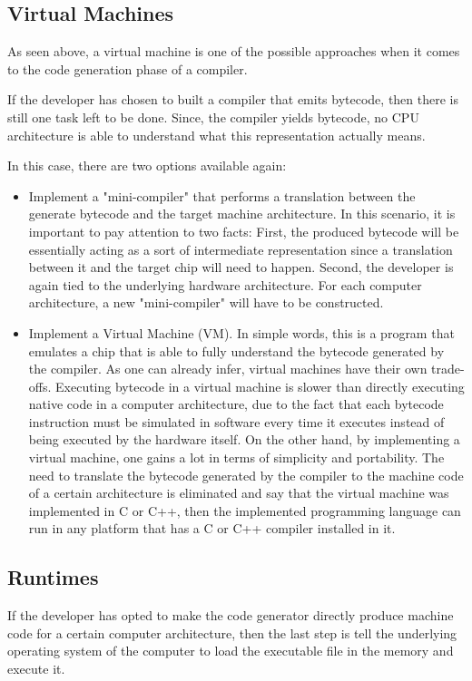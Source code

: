 \subsection{Virtual Machines}
As seen above, a virtual machine is one of the possible approaches when it comes to the code generation phase of a compiler.

If the developer has chosen to built a compiler that emits bytecode, then there is still one task left to be done. Since, the compiler yields bytecode, no CPU architecture is able to understand what this representation actually means.

In this case, there are two options available again:
\begin{itemize}
    \item Implement a "mini-compiler" that performs a translation between the generate bytecode and the target machine architecture. In this scenario, it is important to pay attention to two facts: First, the produced bytecode will be essentially acting as a sort of intermediate representation since a translation between it and the target chip will need to happen. Second, the developer is again tied to the underlying hardware architecture. For each computer architecture, a new "mini-compiler" will have to be constructed.
    
    \item Implement a Virtual Machine (VM). In simple words, this is a program that emulates a chip that is able to fully understand the bytecode generated by the compiler. As one can already infer, virtual machines have their own trade-offs. Executing bytecode in a virtual machine is slower than directly executing native code in a computer architecture, due to the fact that each bytecode instruction must be simulated in software every time it executes instead of being executed by the hardware itself. On the other hand, by implementing a virtual machine, one gains a lot in terms of simplicity and portability. The need to translate the bytecode generated by the compiler to the machine code of a certain architecture is eliminated and say that the virtual machine was implemented in C or C++, then the implemented programming language can run in any platform that has a C or C++ compiler installed in it.
\end{itemize}


\subsection{Runtimes}
If the developer has opted to make the code generator directly produce machine code for a certain computer architecture, then the last step is tell the underlying operating system of the computer to load the executable file in the memory and execute it.

